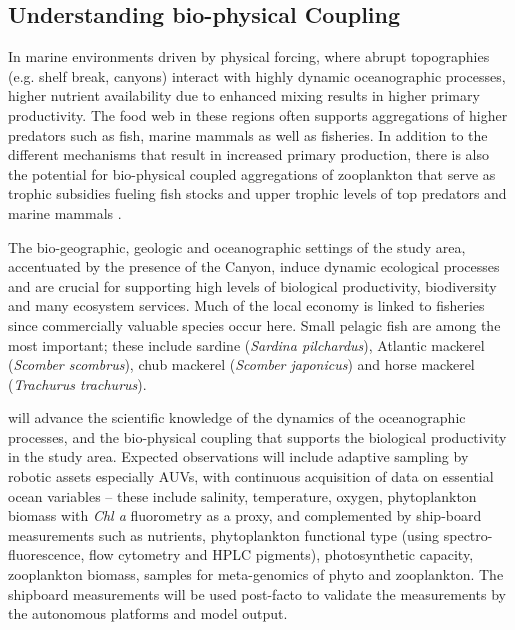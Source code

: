 \subsection{Understanding bio-physical Coupling}


In marine environments driven by physical forcing, where abrupt
topographies (e.g. shelf break, canyons) interact with highly dynamic
oceanographic processes, higher nutrient availability due to enhanced
mixing results in higher primary productivity.  The food web in these
regions often supports aggregations of higher predators such as fish,
marine mammals as well as fisheries. In addition to the different
mechanisms that result in increased primary production, there is also
the potential for bio-physical coupled aggregations of zooplankton
that serve as trophic subsidies fueling fish stocks and upper trophic
levels of top predators and marine mammals \cite{genin04}.

The bio-geographic, geologic and oceanographic settings of the study
area, accentuated by the presence of the \naz Canyon, induce dynamic
ecological processes and are crucial for supporting high levels of
biological productivity, biodiversity and many ecosystem
services. Much of the local economy is linked to fisheries since
commercially valuable species occur here. Small pelagic fish are among
the most important; these include sardine (\emph{Sardina pilchardus}),
Atlantic mackerel (\emph{Scomber scombrus}), chub mackerel
(\emph{Scomber japonicus}) and horse mackerel (\emph{Trachurus
  trachurus}).

\proj will advance the scientific knowledge of the dynamics of the
oceanographic processes, and the bio-physical coupling that supports
the biological productivity in the study area. Expected observations
will include adaptive sampling by robotic assets especially AUVs, with
continuous acquisition of data on essential ocean variables -- these
include salinity, temperature, oxygen, phytoplankton biomass with
\emph{Chl a} fluorometry as a proxy, and complemented by ship-board
measurements such as nutrients, phytoplankton functional type (using
spectro-fluorescence, flow cytometry and HPLC pigments), photosynthetic
capacity, zooplankton biomass, samples for meta-genomics of phyto and
zooplankton.  The shipboard measurements will be used post-facto to
validate the measurements by the autonomous platforms and model
output.

